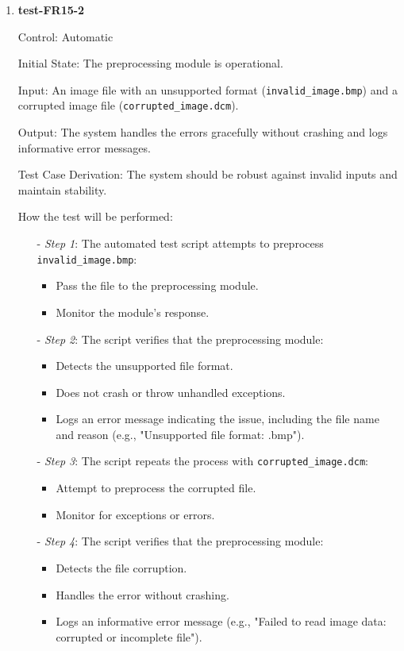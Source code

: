 \documentclass[12pt, titlepage]{article}
\begin{document}
\begin{enumerate}
\item \textbf{test-FR15-2} \label{test-FR15-2}

Control: Automatic

Initial State: The preprocessing module is operational.

Input: An image file with an unsupported format (\texttt{invalid\_image.bmp}) and a corrupted image file (\texttt{corrupted\_image.dcm}).

Output: The system handles the errors gracefully without crashing and logs informative error messages.

Test Case Derivation: The system should be robust against invalid inputs and maintain stability.

How the test will be performed:

\begin{itemize}
  \item[-] \textit{Step 1}: The automated test script attempts to preprocess \texttt{invalid\_image.bmp}:
    \begin{itemize}
      \item Pass the file to the preprocessing module.
      \item Monitor the module's response.
    \end{itemize}
  \item[-] \textit{Step 2}: The script verifies that the preprocessing module:
    \begin{itemize}
      \item Detects the unsupported file format.
      \item Does not crash or throw unhandled exceptions.
      \item Logs an error message indicating the issue, including the file name and reason (e.g., "Unsupported file format: .bmp").
    \end{itemize}
  \item[-] \textit{Step 3}: The script repeats the process with \texttt{corrupted\_image.dcm}:
    \begin{itemize}
      \item Attempt to preprocess the corrupted file.
      \item Monitor for exceptions or errors.
    \end{itemize}
  \item[-] \textit{Step 4}: The script verifies that the preprocessing module:
    \begin{itemize}
      \item Detects the file corruption.
      \item Handles the error without crashing.
      \item Logs an informative error message (e.g., "Failed to read image data: corrupted or incomplete file").
    \end{itemize}
\end{itemize}

\end{enumerate}
\end{document}
